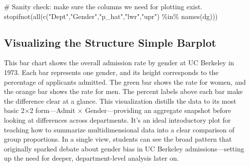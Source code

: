 \documentclass[
  letterpaper,
  DIV=11,
  numbers=noendperiod]{scrreprt}
\newenvironment{Shaded}{\begin{snugshade}}{\end{snugshade}}
\newcommand{\CommentTok}[1]{\textcolor[rgb]{0.37,0.37,0.37}{#1}}
\newcommand{\FunctionTok}[1]{\textcolor[rgb]{0.28,0.35,0.67}{#1}}
\newcommand{\NormalTok}[1]{\textcolor[rgb]{0.00,0.23,0.31}{#1}}
\newcommand{\SpecialCharTok}[1]{\textcolor[rgb]{0.37,0.37,0.37}{#1}}
\newcommand{\StringTok}[1]{\textcolor[rgb]{0.13,0.47,0.30}{#1}}
\begin{document}
\begin{Shaded}
\begin{Highlighting}[]
\CommentTok{\# Sanity check: make sure the columns we need for plotting exist.}
\FunctionTok{stopifnot}\NormalTok{(}\FunctionTok{all}\NormalTok{(}\FunctionTok{c}\NormalTok{(}\StringTok{"Dept"}\NormalTok{,}\StringTok{"Gender"}\NormalTok{,}\StringTok{"p\_hat"}\NormalTok{,}\StringTok{"lwr"}\NormalTok{,}\StringTok{"upr"}\NormalTok{) }\SpecialCharTok{\%in\%} \FunctionTok{names}\NormalTok{(dg)))}
\end{Highlighting}
\end{Shaded}

\subsection{Visualizing the Structure Simple
Barplot}\label{visualizing-the-structure-simple-barplot}

This bar chart shows the overall admission rate by gender at UC Berkeley
in 1973. Each bar represents one gender, and its height corresponds to
the percentage of applicants admitted. The green bar shows the rate for
women, and the orange bar shows the rate for men. The percent labels
above each bar make the difference clear at a glance. This visualization
distills the data to its most basic 2×2 form---Admit ×
Gender---providing an aggregate snapshot before looking at differences
across departments. It's an ideal introductory plot for teaching how to
summarize multidimensional data into a clear comparison of group
proportions. In a single view, students can see the broad pattern that
originally sparked debate about gender bias in UC Berkeley
admissions---setting up the need for deeper, department-level analysis
later on.
\end{document}
